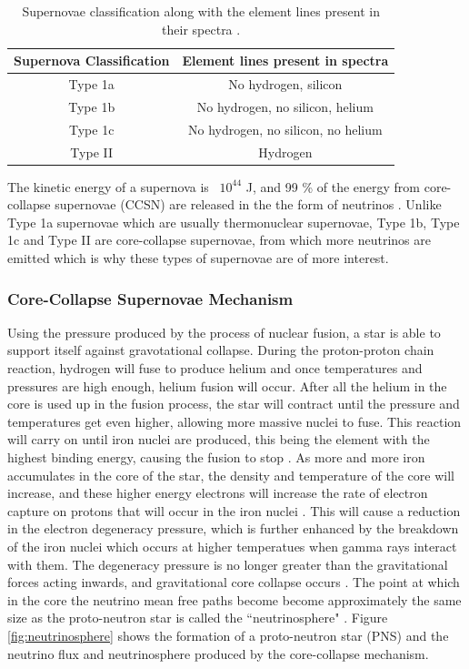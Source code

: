 \begin{table}
\centering
\begin{tabular}{||c c||} 
    \hline
    Supernova Classification & Element lines present in spectra \\ 
    \hline 
    Type 1a & No hydrogen, silicon  \\ 
    \hline
    Type 1b & No hydrogen, no silicon, helium  \\
    \hline
    Type 1c & No hydrogen, no silicon, no helium  \\
    \hline
    Type II & Hydrogen  \\
    \hline 
\end{tabular}
\caption{Supernovae classification along with the element lines present in their spectra \cite{Gal_Yam_2017}.}
\label{table:supernova_classification}
\end{table}

The kinetic energy of a supernova is ~$10^{44}$ J, and 99 \% of the energy from core-collapse supernovae (CCSN) are released in the the form of neutrinos \cite{scholberg2012supernova}. Unlike Type 1a supernovae which are usually thermonuclear supernovae, Type 1b, Type 1c and Type II are core-collapse supernovae, from which more neutrinos are emitted which is why these types of supernovae are of more interest. 

\subsubsection{Core-Collapse Supernovae Mechanism}

Using the pressure produced by the process of nuclear fusion, a star is able to support itself against gravotational collapse. During the proton-proton chain reaction, hydrogen will fuse to produce helium and once temperatures and pressures are high enough, helium fusion will occur. After all the helium in the core is used up in the fusion process, the star will contract until the pressure and temperatures get even higher, allowing more massive nuclei to fuse. This reaction will carry on until iron nuclei are produced, this being the element with the highest binding energy, causing the fusion to stop \cite{couch2017mechanism}.
\newline
As more and more iron accumulates in the core of the star, the density and temperature of the core will increase, and these higher energy electrons will increase the rate of electron capture on protons that will occur in the iron nuclei \cite{fryer2019gamma}. This will cause a reduction in the electron degeneracy pressure, which is further enhanced by the breakdown of the iron nuclei which occurs at higher temperatues when gamma rays interact with them. The degeneracy pressure is no longer greater than the gravitational forces acting inwards, and gravitational core collapse occurs \cite{ebinger2017global}. 
\newline
The point at which in the core the neutrino mean free paths become become approximately the same size as the proto-neutron star is called the ``neutrinosphere" \cite{PhysRevD.101.023018}.  Figure \ref{fig:neutrinosphere} shows the formation of a proto-neutron star (PNS) and the neutrino flux and neutrinosphere produced by the core-collapse mechanism. 

